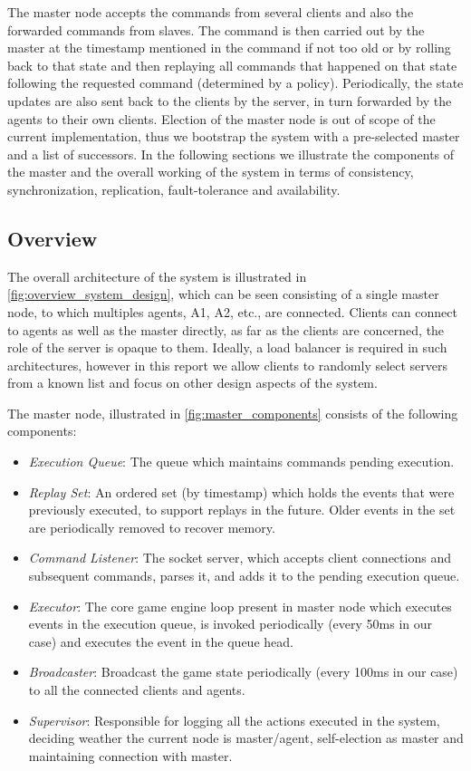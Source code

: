 \documentclass[a4paper]{IEEEtran}
\begin{document}
  The master node accepts the commands from several clients and also the forwarded commands from slaves. The command is then carried out by the master at the timestamp mentioned in the command if not too old or by rolling back to that state and then replaying all commands that happened on that state following the requested command (determined by a policy). Periodically, the state updates are also sent back to the clients by the server, in turn forwarded by the agents to their own clients. Election of the master node is out of scope of the current implementation, thus we bootstrap the system with a pre-selected master and a list of successors. In the following sections we illustrate the components of the master and the overall working of the system in terms of consistency, synchronization, replication, fault-tolerance and availability.

  \subsection{Overview} \label{system_design_overview}
  
  The overall architecture of the system is illustrated in \autoref{fig:overview_system_design}, which can be seen consisting of a single master node, to which multiples agents, A1, A2, etc., are connected. Clients can connect to agents as well as the master directly, as far as the clients are concerned, the role of the server is opaque to them. Ideally, a load balancer is required in such architectures, however in this report we allow clients to randomly select servers from a known list and focus on other design aspects of the system. 
  
  The master node, illustrated in \autoref{fig:master_components} consists of the following components:
  
  \begin{itemize}
    \item \emph{Execution Queue}: The queue which maintains commands pending execution.
    \item \emph{Replay Set}: An ordered set (by timestamp) which holds the events that were previously executed, to support replays in the future. Older events in the set are periodically removed to recover memory. 
    \item \emph{Command Listener}: The socket server, which accepts client connections and subsequent commands, parses it, and adds it to the pending execution queue.
    \item \emph{Executor}: The core game engine loop present in master node which executes events in the execution queue, is invoked periodically (every 50ms in our case) and executes the event in the queue head.
    \item \emph{Broadcaster}: Broadcast the game state periodically (every 100ms in our case) to all the connected clients and agents. 
    \item \emph{Supervisor}: Responsible for logging all the actions executed in the system, deciding weather the current node is master/agent, self-election as master and maintaining connection with master.
  \end{itemize}
\end{document}

